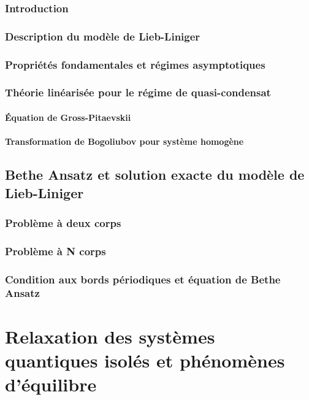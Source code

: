 \minitoc

%

\section*{Introduction}
%

\section{Description du modèle de Lieb-Liniger}

\section{Propriétés fondamentales et régimes asymptotiques}
\section{Théorie linéarisée pour le régime de quasi-condensat}
\subsection{Équation de Gross-Pitaevskii}
\subsection{Transformation de Bogoliubov pour système homogène}

\chapter{Bethe Ansatz et solution exacte du modèle de Lieb-Liniger}
\minitoc
\section{Problème à deux corps}
\section{Problème à N corps}
\section{Condition aux bords périodiques et équation de Bethe Ansatz}


\part{Relaxation des systèmes quantiques isolés et phénomènes d'équilibre}

